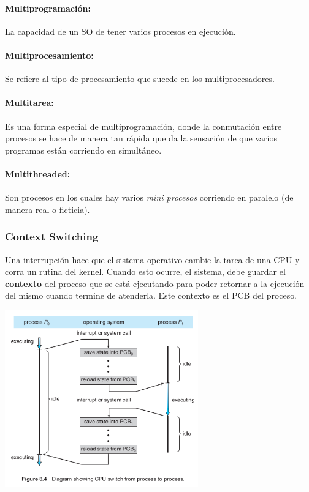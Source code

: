 \paragraph{Multiprogramación:} La capacidad de un SO de tener varios procesos en ejecución.
\paragraph{Multiprocesamiento:} Se refiere al tipo de procesamiento que sucede en los multiprocesadores.
\paragraph{Multitarea:} Es una forma especial de multiprogramación, donde la conmutación entre procesos se hace de manera tan rápida que da la sensación de que varios programas están corriendo en simultáneo.
\paragraph{Multithreaded:} Son procesos en los cuales hay varios \textit{mini procesos} corriendo en paralelo (de manera real o ficticia).

\subsubsection{Context Switching}
Una interrupción hace que el sistema operativo cambie la tarea de una CPU y corra un rutina del kernel. Cuando esto ocurre, el sistema, debe guardar el \textbf{contexto} del proceso que se está ejecutando para poder retornar a la ejecución del mismo cuando termine de atenderla. Este contexto es el PCB del proceso.

\vspace*{0.5cm}
\begin{center}
	\includegraphics[width=0.625\textwidth]{imagenes/context-switch.png}

\end{center}

